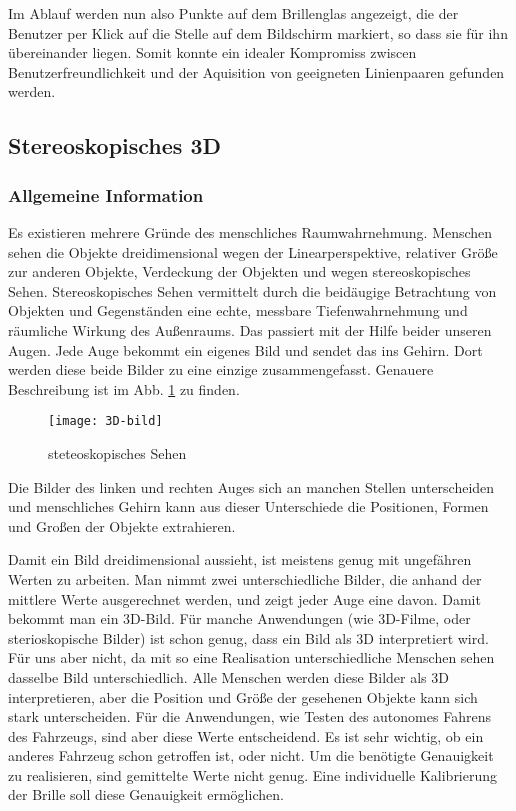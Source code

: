     Im Ablauf werden nun also Punkte auf dem Brillenglas angezeigt, die der Benutzer per Klick auf die Stelle auf dem Bildschirm markiert, so dass sie für ihn übereinander liegen. Somit konnte ein idealer Kompromiss zwiscen Benutzerfreundlichkeit und der Aquisition von geeigneten Linienpaaren gefunden werden.


\subsection{Stereoskopisches 3D}

\subsubsection{Allgemeine Information}
Es existieren mehrere Gründe des menschliches Raumwahrnehmung.
Menschen sehen die Objekte dreidimensional wegen der Linearperspektive, relativer Größe zur anderen Objekte, Verdeckung der Objekten und wegen stereoskopisches Sehen. 
Stereoskopisches Sehen vermittelt durch die beidäugige Betrachtung von Objekten und Gegenständen eine echte, messbare Tiefenwahrnehmung und räumliche Wirkung des Außenraums. 
Das passiert mit der Hilfe beider unseren Augen.
Jede Auge bekommt ein eigenes Bild und sendet das ins Gehirn. 
Dort werden diese beide Bilder zu eine einzige zusammengefasst.
Genauere Beschreibung ist im Abb. \ref{fig:3D} zu finden.

\begin{figure}[h]
   \centering
   \texttt{[image: 3D-bild]}
   \caption{steteoskopisches Sehen}
   \label{fig:3D}
\end{figure}

Die Bilder des linken und rechten Auges sich an manchen Stellen unterscheiden und menschliches Gehirn kann aus dieser Unterschiede die Positionen, Formen und Großen der Objekte extrahieren.

Damit ein Bild dreidimensional aussieht, ist meistens genug mit ungefähren Werten zu arbeiten.
Man nimmt zwei unterschiedliche Bilder, die anhand der mittlere Werte ausgerechnet werden, und zeigt jeder Auge eine davon. 
Damit bekommt man ein 3D-Bild. 
Für manche Anwendungen (wie 3D-Filme, oder sterioskopische Bilder) ist schon genug,  dass ein Bild als 3D interpretiert wird. 
Für uns aber nicht, da mit so eine Realisation unterschiedliche Menschen sehen dasselbe Bild unterschiedlich.
Alle Menschen werden diese Bilder als 3D interpretieren, aber die Position und Größe der gesehenen Objekte kann sich stark unterscheiden.
Für die Anwendungen, wie Testen des autonomes Fahrens des Fahrzeugs, sind aber diese Werte entscheidend.
Es ist sehr wichtig, ob ein anderes Fahrzeug schon getroffen ist, oder nicht.
Um die benötigte Genauigkeit zu realisieren, sind gemittelte Werte nicht genug.
Eine individuelle Kalibrierung der Brille soll diese Genauigkeit ermöglichen.

